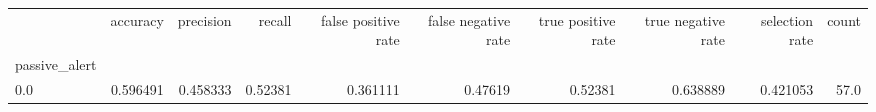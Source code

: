 \begin{tabular}{lrrrrrrrrr}
\toprule
{} &  accuracy &  precision &   recall &  false positive rate &  false negative rate &  true positive rate &  true negative rate &  selection rate &  count \\
passive\_alert &           &            &          &                      &                      &                     &                     &                 &        \\
\midrule
0.0           &  0.596491 &   0.458333 &  0.52381 &             0.361111 &              0.47619 &             0.52381 &            0.638889 &        0.421053 &   57.0 \\
\bottomrule
\end{tabular}
